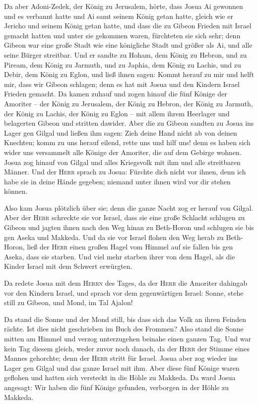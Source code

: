  Da aber Adoni-Zedek, der König zu Jerusalem, hörte, dass
Josua Ai gewonnen und es verbannt hatte und Ai samt seinem König getan
hatte, gleich wie er Jericho und seinem König getan hatte, und dass die
zu Gibeon Frieden mit Israel gemacht hatten und unter sie gekommen
waren,  fürchteten sie sich sehr; denn Gibeon war eine
große Stadt wie eine königliche Stadt und größer als Ai, und alle seine
Bürger streitbar.  Und er sandte zu Hoham, dem König zu
Hebron, und zu Piream, dem König zu Jarmuth, und zu Japhia, dem König zu
Lachis, und zu Debir, dem König zu Eglon, und ließ ihnen sagen:
 Kommt herauf zu mir und helft mir, dass wir Gibeon
schlagen; denn es hat mit Josua und den Kindern Israel Frieden gemacht.
 Da kamen zuhauf und zogen hinauf die fünf Könige der
Amoriter -- der König zu Jerusalem, der König zu Hebron, der König zu
Jarmuth, der König zu Lachis, der König zu Eglon -- mit allem ihrem
Heerlager und belagerten Gibeon und stritten dawider. 
Aber die zu Gibeon sandten zu Josua ins Lager gen Gilgal und ließen ihm
sagen: Zieh deine Hand nicht ab von deinen Knechten; komm zu uns herauf
eilend, rette uns und hilf uns! denn es haben sich wider uns versammelt
alle Könige der Amoriter, die auf dem Gebirge wohnen. 
Josua zog hinauf von Gilgal und alles Kriegsvolk mit ihm und alle
streitbaren Männer.  Und der \textsc{Herr} sprach zu
Josua: Fürchte dich nicht vor ihnen, denn ich habe sie in deine Hände
gegeben; niemand unter ihnen wird vor dir stehen können.

 Also kam Josua plötzlich über sie; denn die ganze Nacht
zog er herauf von Gilgal.  Aber der \textsc{Herr}
schreckte sie vor Israel, dass sie eine große Schlacht schlugen zu
Gibeon und jagten ihnen nach den Weg hinan zu Beth-Horon und schlugen
sie bis gen Aseka und Makkeda.  Und da sie vor Israel
flohen den Weg herab zu Beth-Horon, ließ der \textsc{Herr} einen großen
Hagel vom Himmel auf sie fallen bis gen Aseka, dass sie starben. Und
viel mehr starben ihrer von dem Hagel, als die Kinder Israel mit dem
Schwert erwürgten.

 Da redete Josua mit dem \textsc{Herrn} des Tages, da der
\textsc{Herr} die Amoriter dahingab vor den Kindern Israel, und sprach
vor dem gegenwärtigen Israel: Sonne, stehe still zu Gibeon, und Mond, im
Tal Ajalon!

 Da stand die Sonne und der Mond still, bis dass sich das
Volk an ihren Feinden rächte. Ist dies nicht geschrieben im Buch des
Frommen? Also stand die Sonne mitten am Himmel und verzog unterzugehen
beinahe einen ganzen Tag.  Und war kein Tag diesem
gleich, weder zuvor noch danach, da der \textsc{Herr} der Stimme eines
Mannes gehorchte; denn der \textsc{Herr} stritt für Israel.
 Josua aber zog wieder ins Lager gen Gilgal und das ganze
Israel mit ihm.  Aber diese fünf Könige waren geflohen
und hatten sich versteckt in die Höhle zu Makkeda.  Da
ward Josua angesagt: Wir haben die fünf Könige gefunden, verborgen in
der Höhle zu Makkeda.

